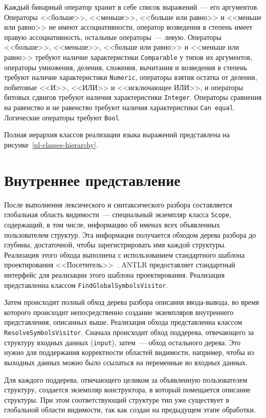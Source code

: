 \documentclass[times,specification,annotation]{style/itmo-student-thesis/itmo-student-thesis}
\begin{document}
Каждый бинарный оператор хранит в себе список выражений~--- его аргументов. Операторы <<больше>>, <<меньше>>, <<больше или равно>> и <<меньше или равно>> не имеют ассоциативности, оператор возведения в степень имеет правую ассоциативность, остальные операторы~--- левую. Операторы <<больше>>, <<меньше>>, <<больше или равно>> и <<меньше или равно>> требуют наличие характеристики \texttt{Comparable} у типов их аргументов, операторы умножения, деления, сложения, вычитания и возведения в степень требуют наличие характеристики \texttt{Numeric}, операторы взятия остатка от деления, побитовые <<И>>, <<ИЛИ>> и <<исключающее ИЛИ>>, и операторы битовых сдвигов требуют наличия характеристики \texttt{Integer}. Операторы сравнения на равенство и не равенство требуют наличия характеристики \texttt{Can equal}. Логические операторы требуют \texttt{Bool}.

Полная иерархия классов реализации языка выражений представлена на рисунке~\ref{pl-classes-hierarchy}.

\section{Внутреннее представление}

После выполнения лексического и синтаксического разбора составляется глобальная область видимости~--- специальный экземпляр класса \texttt{Scope}, содержащий, в том числе, информацию об именах всех объявленных пользователем структур. Эта информация получается обходом дерева разбора до глубины, достаточной, чтобы зарегистрировать имя каждой структуры. Реализация этого обхода выполнена с использованием стандартного шаблона проектирования <<Посетитель>>~\cite{design-patterns}. ANTLR предоставляет стандартный интерфейс для реализации этого шаблона проектирования. Реализация представленна классом \texttt{FindGlobalSymbolsVisitor}.

Затем происходит полный обход дерева разбора описания ввода-вывода, во время которого происходит непосредственно создание экземпляров внутреннего представления, описанных выше. Реализация обхода представленна классом \texttt{ResolveSymbolsVisitor}. Сначала происходит обход поддерева, отвечающего за структуру входных данных (\texttt{input}), затем~--- обход остального дерева. Это нужно для поддержания корректности областей видимости, например, чтобы из выходных данных можно было ссылаться на переменные во входных данных.

Для каждого поддерева, отвечающего целиком за объявленную пользователем структуру, создается экземпляр конструктора, в который помещается описание структуры. При этом соответствующий структуре тип уже существует в глобальной области видимости, так как создан на предыдущем этапе обработки.
\end{document}
